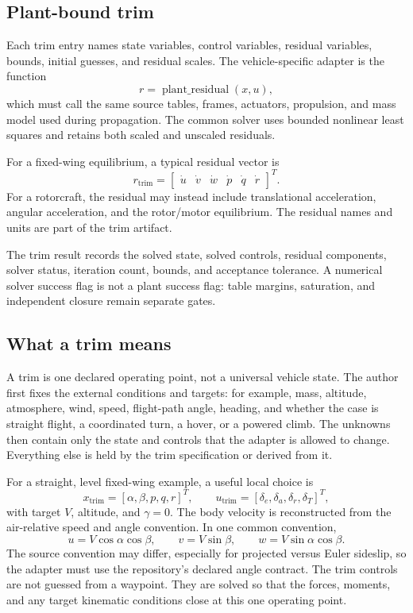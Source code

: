 \documentclass[11pt]{article}
\begin{document}
\subsection{Plant-bound trim}

Each trim entry names state variables, control variables, residual variables,
bounds, initial guesses, and residual scales. The vehicle-specific adapter is
the function
\[
  r = \operatorname{plant\_residual}(x,u),
\]
which must call the same source tables, frames, actuators, propulsion, and mass
model used during propagation. The common solver uses bounded nonlinear least
squares and retains both scaled and unscaled residuals.

For a fixed-wing equilibrium, a typical residual vector is
\[
  r_{\mathrm{trim}} =
  \begin{bmatrix}
    \dot u & \dot v & \dot w & \dot p & \dot q & \dot r
  \end{bmatrix}^{T}.
\]
For a rotorcraft, the residual may instead include translational acceleration,
angular acceleration, and the rotor/motor equilibrium. The residual names and
units are part of the trim artifact.

The trim result records the solved state, solved controls, residual components,
solver status, iteration count, bounds, and acceptance tolerance. A numerical
solver success flag is not a plant success flag: table margins, saturation, and
independent closure remain separate gates.

\subsection{What a trim means}

A trim is one declared operating point, not a universal vehicle state. The
author first fixes the external conditions and targets: for example, mass,
altitude, atmosphere, wind, speed, flight-path angle, heading, and whether the
case is straight flight, a coordinated turn, a hover, or a powered climb. The
unknowns then contain only the state and controls that the adapter is allowed
to change. Everything else is held by the trim specification or derived from
it.

For a straight, level fixed-wing example, a useful local choice is
\[
  x_{\mathrm{trim}}=[\alpha,\beta,p,q,r]^{T},\qquad
  u_{\mathrm{trim}}=[\delta_e,\delta_a,\delta_r,\delta_T]^{T},
\]
with target $V$, altitude, and $\gamma=0$. The body velocity is reconstructed
from the air-relative speed and angle convention. In one common convention,
\[
  u=V\cos\alpha\cos\beta,\qquad
  v=V\sin\beta,\qquad
  w=V\sin\alpha\cos\beta.
\]
The source convention may differ, especially for projected versus Euler
sideslip, so the adapter must use the repository's declared angle contract.
The trim controls are not guessed from a waypoint. They are solved so that
the forces, moments, and any target kinematic conditions close at this one
operating point.
\end{document}
